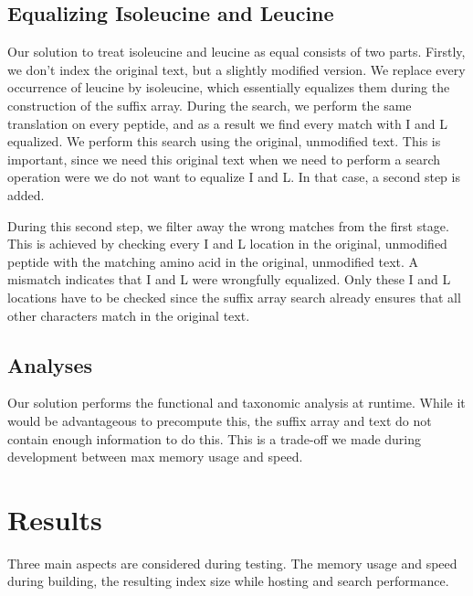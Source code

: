 \documentclass[11pt]{article}
\begin{document}
\begin{multicols}{2}
        \subsection{Equalizing Isoleucine and Leucine}
        Our solution to treat isoleucine and leucine as equal consists of two parts.
        Firstly, we don't index the original text, but a slightly modified version.
        We replace every occurrence of leucine by isoleucine, which essentially equalizes them during the construction of the suffix array.
        During the search, we perform the same translation on every peptide, and as a result we find every match with I and L equalized.
        We perform this search using the original, unmodified text.
        This is important, since we need this original text when we need to perform a search operation were we do not want to equalize I and L\@.
        In that case, a second step is added.

        During this second step, we filter away the wrong matches from the first stage.
        This is achieved by checking every I and L location in the original, unmodified peptide with the matching amino acid in the original, unmodified text.
        A mismatch indicates that I and L were wrongfully equalized.
        Only these I and L locations have to be checked since the suffix array search already ensures that all other characters match in the original text.

        \subsection{Analyses}
        Our solution performs the functional and taxonomic analysis at runtime.
        While it would be advantageous to precompute this, the suffix array and text do not contain enough information to do this.
        This is a trade-off we made during development between max memory usage and speed.

        \section{Results}\label{sec:results}
        Three main aspects are considered during testing.
        The memory usage and speed during building, the resulting index size while hosting and search performance.


\end{multicols}
\end{document}
